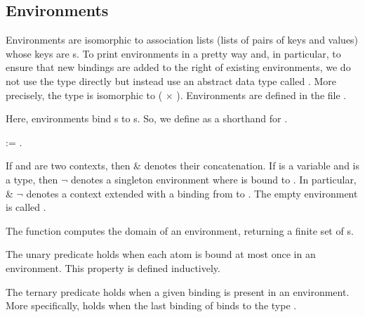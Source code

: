 \documentclass[12pt]{report}
\begin{document}
\subsection{Environments}



 Environments are isomorphic to association lists (lists of pairs of
    keys and values) whose keys are s.  To print environments in a
    pretty way and, in particular, to ensure that new bindings are added
    to the right of existing environments, we do not use the type 
    directly but instead use an abstract data type called . More
    precisely, the type   is isomorphic to  ( \ensuremath{\times} ).
    Environments are defined in the file . 


    Here, environments bind s to s. So, we define  as a
    shorthand for  . 

\begin{coqdoccode}
\coqdocemptyline
\coqdocnoindent
{}  :=  .\coqdoceol
\coqdocemptyline
\end{coqdoccode}
If  and  are two contexts, then  \&  denotes their 
    concatenation. If  is a variable and  is a type, then 
     \ensuremath{\lnot}  denotes a singleton environment where  is bound to .
    In particular,  \&  \ensuremath{\lnot}  denotes a context  extended 
    with a binding from  to . The empty environment is 
    called .


 The function  computes the domain of an environment,
    returning a finite set of s. 
\begin{coqdoccode}
\coqdocemptyline
\end{coqdoccode}
The unary predicate  holds when each atom is bound at most
    once in an environment. This property is defined inductively. 
\begin{coqdoccode}
\coqdocemptyline
\coqdocemptyline
\end{coqdoccode}
The ternary predicate  holds when a given binding is
    present in an environment.  More specifically,     holds
    when the last binding of  binds  to the type . 
\begin{coqdoccode}
\coqdocemptyline
\coqdocemptyline
\end{coqdoccode}
\end{document}
